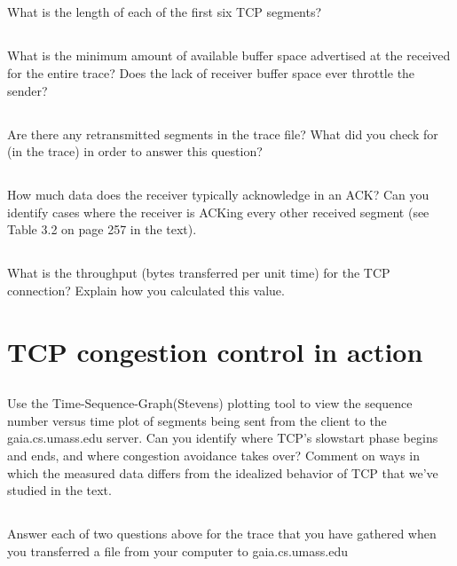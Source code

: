 \documentclass[12pt]{article}
\begin{document}
\subsection{}
What is the length of each of the first six TCP segments?

\subsection{}
What is the minimum amount of available buffer space advertised at the received
for the entire trace? Does the lack of receiver buffer space ever throttle the
sender?

\subsection{}
Are there any retransmitted segments in the trace file? What did you check for (in
the trace) in order to answer this question?

\subsection{}
How much data does the receiver typically acknowledge in an ACK? Can you
identify cases where the receiver is ACKing every other received segment (see
Table 3.2 on page 257 in the text).

\subsection{}
What is the throughput (bytes transferred per unit time) for the TCP connection?
Explain how you calculated this value.

\section{TCP congestion control in action}
\setcounter{subsection}{12}
\subsection{} 
Use the Time-Sequence-Graph(Stevens) plotting tool to view the sequence
number versus time plot of segments being sent from the client to the
gaia.cs.umass.edu server. Can you identify where TCP’s slowstart phase begins
and ends, and where congestion avoidance takes over? Comment on ways in
which the measured data differs from the idealized behavior of TCP that we’ve
studied in the text.

\subsection{}
Answer each of two questions above for the trace that you have gathered when
you transferred a file from your computer to gaia.cs.umass.edu
\end{document}
